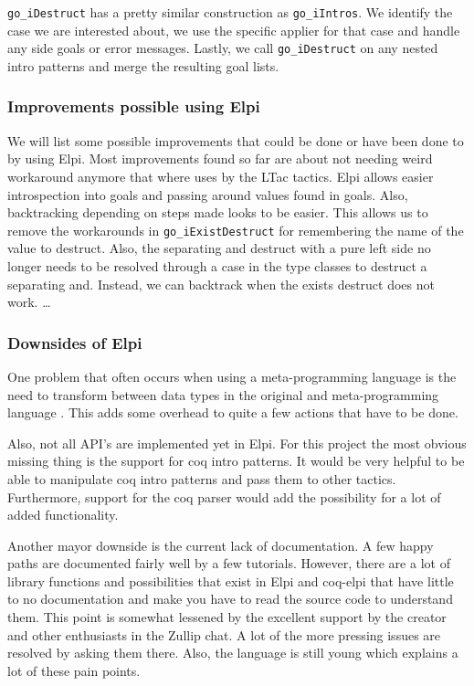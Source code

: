 \documentclass[thesis.tex]{subfiles}
\begin{document}
{{\texttt{go_iDestruct} has a pretty similar construction as \texttt{go_iIntros}. We identify the case we are interested about, we use the specific applier for that case and handle any side goals or error messages. Lastly, we call \texttt{go_iDestruct} on any nested intro patterns and merge the resulting goal lists.

\subsubsection*{Improvements possible using Elpi}
We will list some possible improvements that could be done or have been done to by using Elpi. Most improvements found so far are about not needing weird workaround anymore that where uses by the LTac tactics. Elpi allows easier introspection into goals and passing around values found in goals. Also, backtracking depending on steps made looks to be easier. This allows us to remove the workarounds in \texttt{go_iExistDestruct} for remembering the name of the value to destruct. Also, the separating and destruct with a pure left side no longer needs to be resolved through a case in the type classes to destruct a separating and. Instead, we can backtrack when the exists destruct does not work.
\dots

\subsubsection*{Downsides of Elpi}
One problem that often occurs when using a meta-programming language is the need to transform between data types in the original and meta-programming language \cite*{}. This adds some overhead to quite a few actions that have to be done.

Also, not all API's are implemented yet in Elpi. For this project the most obvious missing thing is the support for coq intro patterns. It would be very helpful to be able to manipulate coq intro patterns and pass them to other tactics. Furthermore, support for the coq parser would add the possibility for a lot of added functionality.

Another mayor downside is the current lack of documentation. A few happy paths are documented fairly well by a few tutorials. However, there are a lot of library functions and possibilities that exist in Elpi and coq-elpi that have little to no documentation and make you have to read the source code to understand them. This point is somewhat lessened by the excellent support by the creator and other enthusiasts in the Zullip chat. A lot of the more pressing issues are resolved by asking them there. Also, the language is still young which explains a lot of these pain points.

}}
\end{document}

